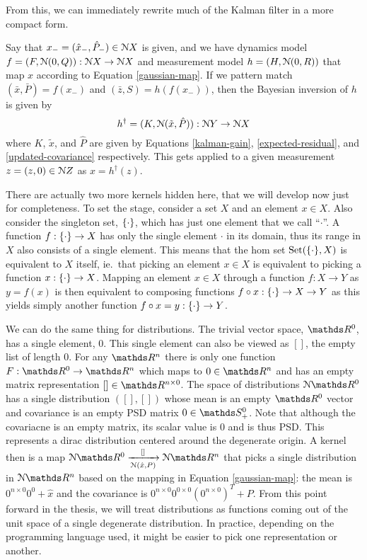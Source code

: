 From this, we can immediately rewrite much of the Kalman filter in a more compact form. 

Say that $x_- = (\hat{x}_-, \hat{P}_-)\in \mathcal{N} X$ is given, and we have dynamics model $f = (F,\mathcal{N}(0,Q)):\mathcal{N} X \rightarrow \mathcal{N} X$ and measurement model $h = (H,\mathcal{N}(0,R))$ that map $x$ according to Equation \ref{gaussian-map}. If we pattern match $(\bar{x}, \bar{P}) = f(x_-)$ and $(\bar{z}, S) = h(f(x_-))$, then the Bayesian inversion of $h$ is given by
\begin{equation}
    \label{kalman-dagger}
    h^\dagger = (K, \mathcal{N}(\tilde{x}, \hat{P})) : \mathcal{N} Y\rightarrow \mathcal{N} X
\end{equation}
where $K$, $\tilde{x}$, and $\hat{P}$ are given by Equations \ref{kalman-gain}, \ref{expected-residual}, and \ref{updated-covariance} respectively. This gets applied to a given measurement $z = (z,0)\in \mathcal{N}{Z}$ as $x = h^\dagger(z)$.

There are actually two more kernels hidden here, that we will develop now just for completeness. To set the stage, consider a set $X$ and an element $x\in X$. Also consider the singleton set, $\{\cdot\}$, which has just one element that we call ``$\cdot$''. A function $f:\{\cdot\}\rightarrow X$ has only the single element $\cdot$ in its domain, thus its range in $X$ also consists of a single element. This means that the hom set $\mathrm{Set}(\{\cdot\}, X)$ is equivalent to $X$ itself, ie.\ that picking an element $x\in X$ is equivalent to picking a function $x:\{\cdot\} \rightarrow X$. Mapping an element $x\in X$ through a function $f:X\rightarrow Y$ as $y=f(x)$ is then equivalent to composing functions $f\circ x:\{\cdot\}\rightarrow X\rightarrow Y$ as this yields simply another function $f\circ x = y :\{\cdot\}\rightarrow Y$.

We can do the same thing for distributions. The trivial vector space, $\reals^0$, has a single element, $0$. This single element can also be viewed as $[]$, the empty list of length 0. For any $\reals^n$ there is only one function $F:\reals^0\rightarrow \reals^n$ which maps to $0\in\reals^n$ and has an empty matrix representation $[]\in \reals^{n\times 0}$. The space of distributions $\gaussian \reals^0$ has a single distribution $([], [])$ whose mean is an empty $\reals^0$ vector and covariance is an empty PSD matrix $0\in\symmetric^0_+$. Note that although the covariacne is an empty matrix, its scalar value is 0 and is thus PSD. This represents a dirac distribution centered around the degenerate origin. A kernel then is a map $\gaussian \reals^0 \xrightarrow[\gaussian(\hat{x},P)]{[]}\gaussian \reals^n$ that picks a single distribution in $\gaussian\reals^n$ based on the mapping in Equation \ref{gaussian-map}: the mean is $0^{n\times 0}0^0 + \hat{x}$ and the covariance is $0^{n\times 0}0^{0\times 0}(0^{n\times 0})^T + P$. From this point forward in the thesis, we will treat distributions as functions coming out of the unit space of a single degenerate distribution. In practice, depending on the programming language used, it might be easier to pick one representation or another.

